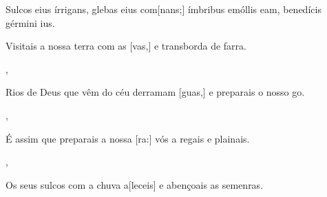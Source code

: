 {    {\item {}Sulcos eius írrigans, glebas eius com[nans;] ímbribus emóllis eam, benedícis gérmini ius.}%
        {\item {}Visitais a nossa terra com as [vas,] e transborda de farra.},
    {}%
        {\item {}Rios de Deus que vêm do céu derramam [guas,] e preparais o nosso go.},
    {}%
        {\item {}É assim que preparais a nossa [ra:] vós a regais e plainais.},
    {}%
        {\item {}Os seus sulcos com a chuva a[leceis] e abençoais as semenras.}
}